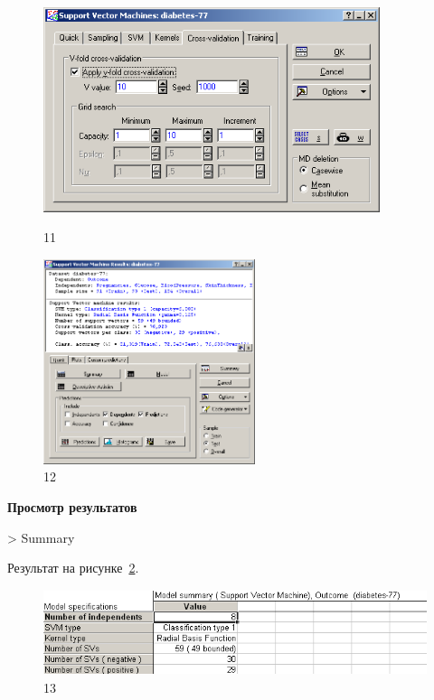 \begin{figure}[!h]
  \centering

  \begin{minipage}{0.49\textwidth}
    \centering

    \includegraphics[height=6cm]
    {inc/v5_11.PNG}

    \caption{11}

    \label{fig:v5_11}
  \end{minipage}
  \begin{minipage}{0.49\textwidth}
    \centering

    \includegraphics[height=6cm]
    {inc/v5_12.PNG}

    \caption{12}

    \label{fig:v5_12}
  \end{minipage}
\end{figure}

\begin{center}
  \textbf{Просмотр результатов}
\end{center}

> Summary

Результат на рисунке~\ref{fig:v5_13}.

\begin{figure}[!h]
  \centering

  \includegraphics[height=2.5cm]
  {inc/v5_13.PNG}

  \caption{13}

  \label{fig:v5_13}
\end{figure}

